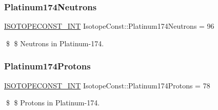 \subsubsection{\texorpdfstring{Platinum174\+Neutrons}{Platinum174Neutrons}}
{\footnotesize\ttfamily \mbox{\hyperlink{group___isotope_const-_macros_ga5f18360b3e99483a35c32d789e62621c}{I\+S\+O\+T\+O\+P\+E\+C\+O\+N\+S\+T\+\_\+\+I\+NT}} Isotope\+Const\+::\+Platinum174\+Neutrons = 96}

\$ \$ Neutrons in Platinum-\/174. \mbox{\label{group___isotope_const-_platinum-_pt174_ga0a95c76f1898a9667c7c7b8c04d782c2}} 
\subsubsection{\texorpdfstring{Platinum174\+Protons}{Platinum174Protons}}
{\footnotesize\ttfamily \mbox{\hyperlink{group___isotope_const-_macros_ga5f18360b3e99483a35c32d789e62621c}{I\+S\+O\+T\+O\+P\+E\+C\+O\+N\+S\+T\+\_\+\+I\+NT}} Isotope\+Const\+::\+Platinum174\+Protons = 78}

\$ \$ Protons in Platinum-\/174. 